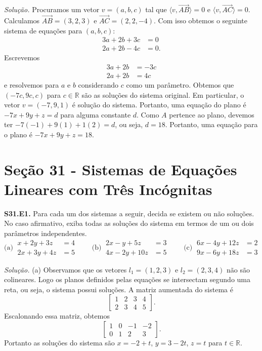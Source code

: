 \documentclass[a4paper,11pt]{article}
\newcommand{\R}{\mathbb{R}}
\begin{document}
\emph{Solução.}
Procuramos um vetor $v = (a,b,c)$ tal que $\langle v, \overrightarrow{AB} \rangle = 0$ e $\langle v, \overrightarrow{AC} \rangle = 0$.
Calculamos $\overrightarrow{AB} = (3,2,3)$ e $\overrightarrow{AC} = (2,2,-4)$.
Com isso obtemos o seguinte sistema de equações para $(a,b,c)$:
\begin{align*}
  3a + 2b + 3c & = 0 \\
  2a + 2b - 4c & = 0.
\end{align*}
Escrevemos
\begin{align*}
  3a + 2b & = -3c \\
  2a + 2b & = 4c
\end{align*}
e resolvemos para $a$ e $b$ considerando $c$ como um parâmetro.
Obtemos que $(-7c, 9c, c)$ para $c \in \R$ são as soluções do sistema original.
Em particular, o vetor $v = (-7, 9, 1)$ é solução do sistema.
Portanto, uma equação do plano é $-7x + 9y + z = d$ para alguma constante $d$.
Como $A$ pertence ao plano, devemos ter $-7(-1) + 9(1) + 1(2) = d$, ou seja, $d = 18$.
Portanto, uma equação para o plano é $-7x + 9y + z = 18$.

\section*{Seção 31 - Sistemas de Equações Lineares com Três Incógnitas}

\textbf{S31.E1.}
Para cada um dos sistemas a seguir, decida se existem ou não soluções.
No caso afirmativo, exiba todas as soluções do sistema em termos de um ou dois parâmetros independentes.
\[
  \text{(a)} \
  \begin{aligned}
    x + 2y + 3z & = 4 \\
    2x + 3y + 4z & = 5
  \end{aligned}
  \qquad
  \text{(b)} \
  \begin{aligned}
    2x - y + 5z & = 3 \\
    4x - 2y + 10z & = 5
  \end{aligned}
  \qquad
  \text{(c)} \
  \begin{aligned}
    6x - 4y + 12z & = 2 \\
    9x - 6y + 18z & = 3
  \end{aligned}
\]

\vspace{\baselineskip}

\emph{Solução.}
(a)
Observamos que os vetores $l_1 = (1,2,3)$ e $l_2 = (2,3,4)$ não são colineares.
Logo os planos definidos pelas equações se intersectam segundo uma reta, ou seja, o sistema possui soluções.
A matriz aumentada do sistema é
\[
  \begin{bmatrix}
    1 & 2 & 3 & 4 \\
    2 & 3 & 4 & 5
  \end{bmatrix}.
\]
Escalonando essa matriz, obtemos
\[
  \begin{bmatrix}
    1 & 0 & -1 & -2 \\
    0 & 1 & 2 & 3
  \end{bmatrix}.
\]
Portanto as soluções do sistema são $x = -2 + t$, $y = 3 - 2t$, $z = t$ para $t \in \R$.
\end{document}
